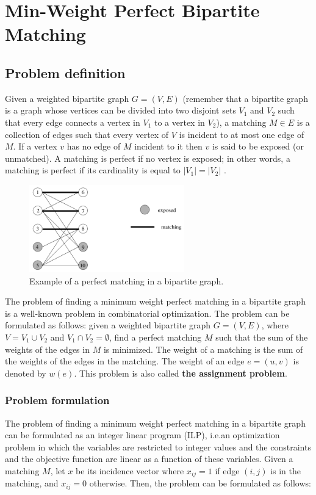 \chapter{Min-Weight Perfect Bipartite Matching}

\section{Problem definition}
Given a weighted bipartite graph $G = (V, E)$ (remember that a bipartite graph is a graph whose vertices can be divided into two disjoint sets $V_1$ and $V_2$ such that every edge connects a vertex in $V_1$ to a vertex in $V_2$), a matching $M \in E$ is a collection of edges such that every vertex of $V$ is incident to at most one edge of $M$. If a vertex $v$ has no edge of $M$ incident to it then $v$ is said to be exposed (or unmatched). A matching is perfect if no vertex is exposed; in other words, a matching is perfect if its cardinality is equal to $|V_1| = |V_2|$ \cite{goemans2009matching}.

\begin{figure}[H]
    \centering
    \includegraphics[width=0.6\textwidth]{Immagini/matching_example.png}
    \caption{Example of a perfect matching in a bipartite graph.}
    \label{fig:matching_example}
\end{figure}

The problem of finding a minimum weight perfect matching in a bipartite graph is a well-known problem in combinatorial optimization. The problem can be formulated as follows: given a weighted bipartite graph $G = (V, E)$, where $V = V_1 \cup V_2$ and $V_1 \cap V_2 = \emptyset$, find a perfect matching $M$ such that the sum of the weights of the edges in $M$ is minimized. The weight of a matching is the sum of the weights of the edges in the matching. The weight of an edge $e = (u, v)$ is denoted by $w(e)$. This problem is also called \textbf{the assignment problem}.

\subsection{Problem formulation}
The problem of finding a minimum weight perfect matching in a bipartite graph can be formulated as an integer linear program (ILP), i.e.an optimization problem in which the variables are restricted to integer values and the constraints and the objective function are linear as a function of these variables. Given a matching $M$, let $x$ be its incidence vector where $x_{ij} = 1$ if edge $(i, j)$ is in the matching, and $x_{ij} = 0$ otherwise. Then, the problem can be formulated as follows:

